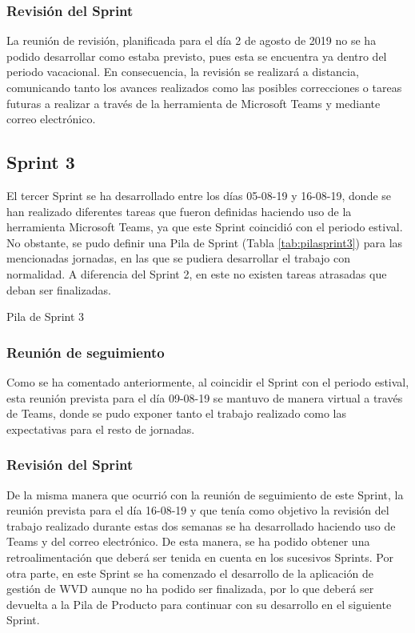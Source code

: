 \subsubsection{Revisión del Sprint}
La reunión de revisión, planificada para el día 2 de agosto de 2019 no se ha podido desarrollar como estaba previsto, pues esta se encuentra ya dentro del periodo vacacional. En consecuencia, la revisión se realizará a distancia, comunicando tanto los avances realizados como las posibles correcciones o tareas futuras a realizar a través de la herramienta de Microsoft Teams y mediante correo electrónico.

\clearpage

\subsection{Sprint 3}
El tercer Sprint se ha desarrollado entre los días 05-08-19 y 16-08-19, donde se han realizado diferentes tareas que fueron definidas haciendo uso de la herramienta Microsoft Teams, ya que este Sprint coincidió con el periodo estival. No obstante, se pudo definir una Pila de Sprint (Tabla \ref{tab:pilasprint3}) para las mencionadas jornadas, en las que se pudiera desarrollar el trabajo con normalidad. A diferencia del Sprint 2, en este no existen tareas atrasadas que deban ser finalizadas.

\begin{table}[!htbp]
	\centering
	{\small
		
	}
	\caption[Pila de Sprint 3]
	{Pila de Sprint 3}
	\label{tab:pilasprint3}
\end{table}

\subsubsection{Reunión de seguimiento}
Como se ha comentado anteriormente, al coincidir el Sprint con el periodo estival, esta reunión prevista para el día 09-08-19 se mantuvo de manera virtual a través de Teams, donde se pudo exponer tanto el trabajo realizado como las expectativas para el resto de jornadas.

\subsubsection{Revisión del Sprint}
De la misma manera que ocurrió con la reunión de seguimiento de este Sprint, la reunión prevista para el día 16-08-19 y que tenía como objetivo la revisión del trabajo realizado durante estas dos semanas se ha desarrollado haciendo uso de Teams y del correo electrónico. De esta manera, se ha podido obtener una retroalimentación que deberá ser tenida en cuenta en los sucesivos Sprints. Por otra parte, en este Sprint se ha comenzado el desarrollo de la aplicación de gestión de \acs{WVD} aunque no ha podido ser finalizada, por lo que deberá ser devuelta a la Pila de Producto para continuar con su desarrollo en el siguiente Sprint.

